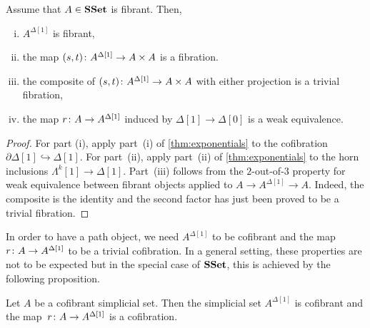 \documentclass[reqno,10pt,a4paper,oneside,draft]{amsart}
\begin{document}
\begin{proposition} \label{thm:id-types-for-types}
Assume that $A \in \mathbf{SSet}$ is fibrant. Then,
\begin{enumerate}[(i)] 
\item $A^{\Delta[1]}$ is fibrant,
\item the map $(s,t) \colon A^{\Delta[1]} \rightarrow A \times A$ is a fibration.
\item the composite of $(s, t) \colon A^{\Delta[1]} \rightarrow A \times A$ with either projection is a trivial fibration,
\item the map $r \colon A \rightarrow A^{\Delta[1]}$ induced by $\Delta[1] \rightarrow \Delta[0]$ is a weak equivalence.
\end{enumerate}
\end{proposition} 

\begin{proof}
For part (i), apply part~(i) of \cref{thm:exponentials} to the cofibration $\partial \Delta[1]  \hookrightarrow \Delta[1]$. For part~(ii), apply part~(ii) of \cref{thm:exponentials} to the horn inclusions $\Lambda^k[1]  \rightarrow \Delta[1]$. Part~(iii) follows from the $2$-out-of-$3$ property for weak equivalence between fibrant objects applied to $A \rightarrow A^{\Delta[1]} \rightarrow A$. Indeed, the
composite is the identity and the second factor has just been proved to be a trivial fibration.
\end{proof}


In order to have a path object, we need $A^{\Delta[1]}$ to be cofibrant and the map $r \colon A \rightarrow A^{\Delta[1]}$ to be a trivial cofibration. In a general setting, these properties are not to be expected
but in the special case of $\mathbf{SSet}$, this is achieved by the following proposition.

\begin{proposition}\label{proposition:PathObjectCofibrant}
Let $A$ be a cofibrant simplicial set. Then the simplicial set $A^{\Delta[1]}$ is cofibrant and the map~$r \colon A \rightarrow A^{\Delta[1]}$ is a cofibration.
\end{proposition}
\end{document}
